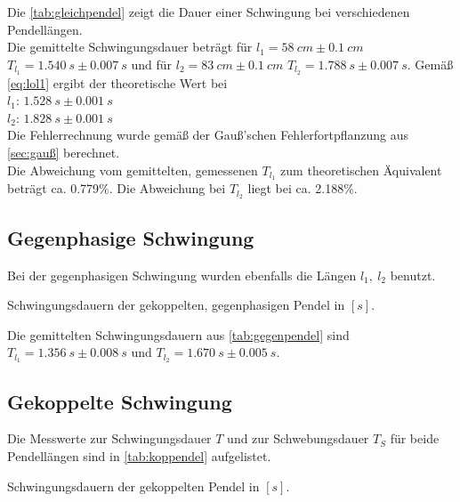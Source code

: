 Die \autoref{tab:gleichpendel} zeigt die Dauer einer Schwingung bei verschiedenen Pendellängen.\\
Die gemittelte Schwingungsdauer beträgt für $l_1 = 58\ cm\pm 0.1\ cm$ $T_{l_1} = 1.540\ s\pm 0.007\ s$ und für $l_2 = 83\ cm\pm 0.1\ cm$ $T_{l_2} = 1.788\ s\pm 0.007\ s$.
\newpage
Gemäß \autoref{eq:lol1} ergibt der theoretische Wert bei\\ $l_{1}$: $1.528\ s\pm0.001\ s$\\ $l_{2}$: $1.828\ s\pm0.001\ s$\\
Die Fehlerrechnung wurde gemäß der Gauß'schen Fehlerfortpflanzung aus \autoref{sec:gauß} berechnet.\\
Die Abweichung vom gemittelten, gemessenen $T_{l_1}$ zum theoretischen Äquivalent beträgt ca. 0.779\%.
Die Abweichung bei $T_{l_2}$ liegt bei ca. 2.188\%.

\subsection{Gegenphasige Schwingung}
Bei der gegenphasigen Schwingung wurden ebenfalls die Längen $l_1, \ l_2$ benutzt.

\begin{table}
  \centering
  \caption{Schwingungsdauern der gekoppelten, gegenphasigen Pendel in $[s]$.}
  \label{tab:gegenpendel}
\end{table}

Die gemittelten Schwingungsdauern aus \autoref{tab:gegenpendel} sind $T_{l_1} = 1.356\ s\pm 0.008\ s$ und $T_{l_2} = 1.670\ s\pm 0.005\ s$.

\subsection{Gekoppelte Schwingung}
Die Messwerte zur Schwingungsdauer $T$ und zur Schwebungsdauer $T_S$ für beide Pendellängen sind in \autoref{tab:koppendel} aufgelistet.
\newpage
\begin{table}
  \centering
  \caption{Schwingungsdauern der gekoppelten Pendel in $[s]$.}
  \label{tab:koppendel}
\end{table}

